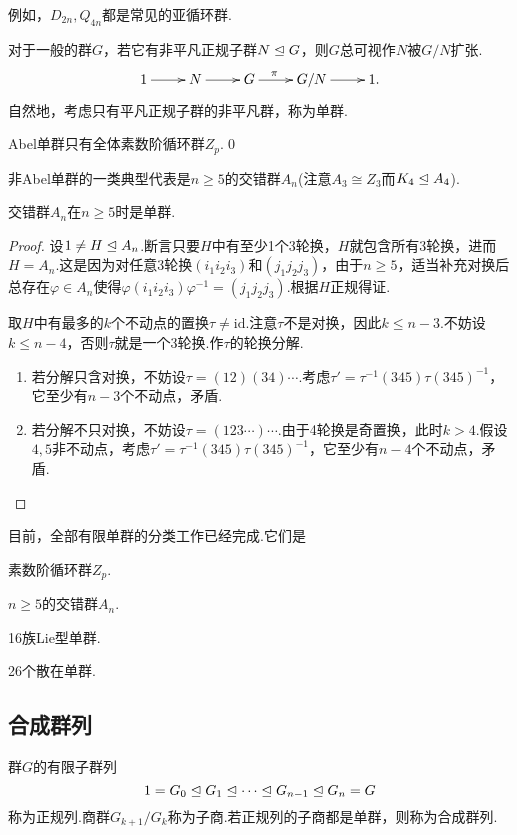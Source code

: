 例如，$D_{2n},Q_{4n}$都是常见的亚循环群.

对于一般的群$G$，若它有非平凡正规子群$N\trianglelefteq G$，则$G$总可视作$N$被$G/N$扩张.
\[
	\xymatrix{
		1\ar[r]&N\ar[r]&G\ar[r]^(0.4)\pi&G/N\ar[r]&1.
	}
\]
自然地，考虑只有平凡正规子群的非平凡群，称为{\heiti 单群}.\hypertarget{text:Simple}{}

\begin{prop}
	Abel单群只有全体素数阶循环群$Z_p$.\qed
\end{prop}

非Abel单群的一类典型代表是$n\ge 5$的交错群$A_n$(注意$A_3\cong Z_3$而$K_4\trianglelefteq A_4$).

\begin{thm}
	交错群$A_n$在$n\ge 5$时是单群.
\end{thm}
\begin{proof}
	设$1\ne H\trianglelefteq A_n$.断言只要$H$中有至少1个3轮换，$H$就包含所有3轮换，进而$H=A_n$.这是因为对任意3轮换$(i_1i_2i_3)$和$(j_1j_2j_3)$，由于$n\ge 5$，适当补充对换后总存在$\varphi\in A_n$使得$\varphi(i_1i_2i_3)\varphi^{-1}=(j_1j_2j_3)$.根据$H$正规得证.

	取$H$中有最多的$k$个不动点的置换$\tau\ne\mathrm{id}$.注意$\tau$不是对换，因此$k\le n-3$.不妨设$k\le n-4$，否则$\tau$就是一个3轮换.作$\tau$的轮换分解.
	\begin{enumerate}
		\item 若分解只含对换，不妨设$\tau=(12)(34)\cdots$.考虑$\tau'=\tau^{-1}(345)\tau(345)^{-1}$，它至少有$n-3$个不动点，矛盾.
		\item 若分解不只对换，不妨设$\tau=(123\cdots)\cdots$.由于4轮换是奇置换，此时$k>4$.假设$4,5$非不动点，考虑$\tau'=\tau^{-1}(345)\tau(345)^{-1}$，它至少有$n-4$个不动点，矛盾.
	\end{enumerate}
\end{proof}

目前，全部有限单群的分类工作已经完成.它们是

\noindent\begin{enumerate*}
	\item 素数阶循环群$Z_p$.
	\item $n\ge 5$的交错群$A_n$.
	\item 16族Lie型单群.
	\item 26个散在单群.
\end{enumerate*}

\subsection{合成群列}
\begin{definition}
	群$G$的有限子群列
	\[
		1=G_0\trianglelefteq G_1\trianglelefteq\cdots\trianglelefteq G_{n-1}\trianglelefteq G_n=G
	\]
	称为{\heiti 正规列}.商群$G_{k+1}/G_k$称为{\heiti 子商}.若正规列的子商都是单群，则称为{\heiti 合成群列}.
\end{definition}

